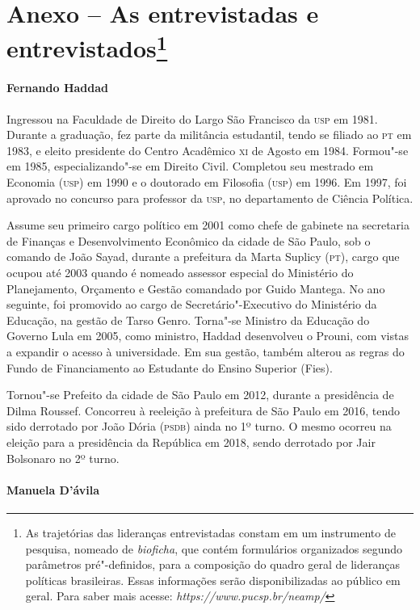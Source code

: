 \section{Anexo -- As entrevistadas e entrevistados\footnote{As
  trajetórias das lideranças entrevistadas constam em um instrumento de
  pesquisa, nomeado de \emph{bioficha}, que contém formulários
  organizados segundo parâmetros pré"-definidos, para a composição do
  quadro geral de lideranças políticas brasileiras. Essas informações
  serão disponibilizadas ao público em geral. Para saber mais acesse:
  \emph{https://www.pucsp.br/neamp/}}}

\paragraph{Fernando Haddad}

Ingressou na Faculdade de Direito do Largo São Francisco da \textsc{usp} em 1981.
Durante a graduação, fez parte da militância estudantil, tendo se
filiado ao \textsc{pt} em 1983, e eleito presidente do Centro Acadêmico \textsc{xi} de
Agosto em 1984. Formou"-se em 1985, especializando"-se em Direito Civil.
Completou seu mestrado em Economia (\textsc{usp}) em 1990 e o doutorado em
Filosofia (\textsc{usp}) em 1996. Em 1997, foi aprovado no concurso para
professor da \textsc{usp}, no departamento de Ciência Política.

Assume seu primeiro cargo político em 2001 como chefe de gabinete na
secretaria de Finanças e Desenvolvimento Econômico da cidade de São
Paulo, sob o comando de João Sayad, durante a prefeitura da Marta
Suplicy (\textsc{pt}), cargo que ocupou até 2003 quando é nomeado assessor
especial do Ministério do Planejamento, Orçamento e Gestão comandado por
Guido Mantega. No ano seguinte, foi promovido ao cargo de
Secretário"-Executivo do Ministério da Educação, na gestão de Tarso
Genro. Torna"-se Ministro da Educação do Governo Lula em 2005, como
ministro, Haddad desenvolveu o Prouni, com vistas a expandir o acesso à
universidade. Em sua gestão, também alterou as regras do Fundo de
Financiamento ao Estudante do Ensino Superior (Fies).

Tornou"-se Prefeito da cidade de São Paulo em 2012, durante a presidência
de Dilma Roussef. Concorreu à reeleição à prefeitura de São Paulo em
2016, tendo sido derrotado por João Dória (\textsc{psdb}) ainda no 1º turno. O
mesmo ocorreu na eleição para a presidência da República em 2018, sendo
derrotado por Jair Bolsonaro no 2º turno.

\paragraph{Manuela D'ávila}

